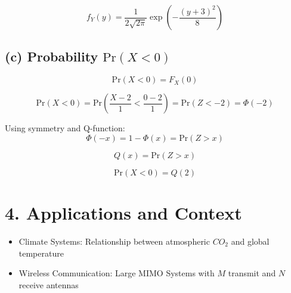 \documentclass[12pt]{article}
\begin{document}
\[
f_Y(y) =
\frac{1}{2\sqrt{2\pi}}
\exp\left(
-\frac{(y+3)^2}{8}
\right)
\]

\subsection*{(c) Probability $\text{Pr}(X < 0)$}

\[
\text{Pr}(X < 0) = F_X(0)
\]

\[
\text{Pr}(X < 0) =
\text{Pr}\left(
\frac{X - 2}{1} < \frac{0 - 2}{1}
\right)
=
\text{Pr}(Z < -2)
= \Phi(-2)
\]

Using symmetry and Q-function:
\[
\Phi(-x) = 1 - \Phi(x) = \text{Pr}(Z > x)
\]

\[
Q(x) = \text{Pr}(Z > x)
\]

\[
\text{Pr}(X < 0) = Q(2)
\]

\section*{4. Applications and Context}

\begin{itemize}
    \item Climate Systems: Relationship between atmospheric $CO_2$ and global temperature
    \item Wireless Communication: Large MIMO Systems with $M$ transmit and $N$ receive antennas
\end{itemize}
\end{document}
